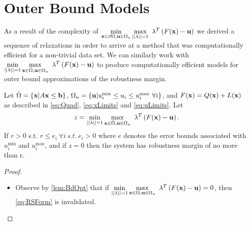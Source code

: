 \section{Outer Bound Models} \label{sec:outbdform}  

As a result of the complexity of $\min\limits_{\bold x\in \partial \Omega, \bold u\in\Omega_u}\max\limits_{||\bold \lambda||=1 }\ \bold\lambda^T\left(F(\bold x)-\bold u\right)$ we derived a sequence of relaxations in order to arrive at a method that was computationally efficient for a non-trivial data set. 
We can similarly work with $\min\limits_{||\bold{\lambda}||=1}\max\limits_{\bold x\in \bar{\Omega}, \bold u\in\Omega_u}\ \bold{\lambda}^T\left(F(\bold x)-\bold u\right)$ to produce computationally efficient models for outer bound approximations of the robustness margin. \\
\begin{thm}\label{thm:OPTfeasOut} 
Let $\bar{\Omega}=\{\bold x| A\bold x\leq \bold b\}$, $\Omega_{u}=\{\bold u| u^{\min}_i\leq u_i \leq u^{\max}_i \ \forall i \}$, and $F(\bold x)=Q(\bold x)+L(\bold x)$ as described in \eqref{eq:Quad}, \eqref{eq:xLimits} and \eqref{eq:uLimits}. 
Let
$$z = \min\limits_{||\bold{\lambda}||=1}\max\limits_{\bold x\in \bar{\Omega}, \bold u\in\Omega_u}\ \bold{\lambda}^T\left(F(\bold x)-\bold u\right).$$
If $r>0$ s.t. $r\leq e_i \ \forall i \ s.t. \ e_i>0$ where $e$ denotes the error bounds associated with $ u^{\min}_i$ and $ u^{\max}_i$, and if $z=0$ then the system has robustness margin of no more than r.

\begin{proof} \ \\
\begin{itemize}
\item[] Observe by \cref{lem:BdOpt} that if $\min\limits_{||\bold{\lambda}||=1}\max\limits_{\bold x\in \Omega, \bold u\in\Omega_u}\ \bold{\lambda}^T\left(F(\bold x)-\bold u\right)=0$, then \eqref{eq:RSForm} is invalidated.  

\end{itemize}
\end{proof}
\end{thm}

